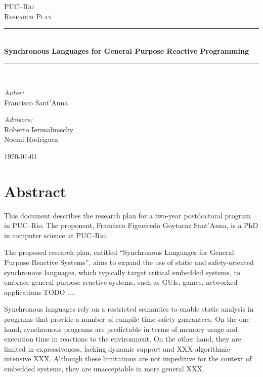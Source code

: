 \documentclass[pdftex,12pt,a4paper]{article}
\begin{document}
\begin{titlepage}
\begin{center}

\textsc{\LARGE PUC--Rio}\\[1.5cm]
\textsc{\Large Research Plan}\\[0.8cm]

\newcommand{\HRule}{\rule{\linewidth}{0.5mm}}
\HRule \\[0.4cm]
{ \huge \bfseries Synchronous Languages for
                  General Purpose Reactive Programming }\\[0.4cm]
\HRule \\[1.5cm]

\begin{minipage}{0.4\textwidth}
\begin{flushleft} \large
\emph{Autor:}\\
Francisco Sant'Anna
\end{flushleft}
\end{minipage}
\begin{minipage}{0.4\textwidth}
\begin{flushright} \large
\emph{Advisors:} \\
Roberto Ierusalimschy \\
Noemi Rodriguez
\end{flushright}
\end{minipage}

\vfill
{\large \today}
\end{center}
\end{titlepage}

\tableofcontents

\newpage
\section{Abstract}

This document describes the research plan for a two-year postdoctoral program 
in PUC--Rio.
The proponent, Francisco Figueiredo Goytacaz Sant'Anna, is a PhD in computer 
science at PUC--Rio.

The proposed research plan, entitled ``Synchronous Languages for General 
Purpose Reactive Systems'', aims to expand the use of static and 
safety-oriented synchronous languages, which typically target critical embedded 
systems, to embrace general purpose reactive systems, such as GUIs, games, 
networked applications TODO ....

Synchronous languages rely on a restricted semantics to enable static analysis 
in programs that provide a number of compile-time safety guarantees.
%
On the one hand, synchronous programs are predictable in terms of memory usage 
and execution time in reactions to the environment.
%
On the other hand, they are limited in expressiveness, lacking dynamic support 
and XXX algorithmic-intensive XXX.
%
Although these limitations are not impeditive for the context of embedded 
systems, they are unacceptable in more general XXX.
\end{document}
